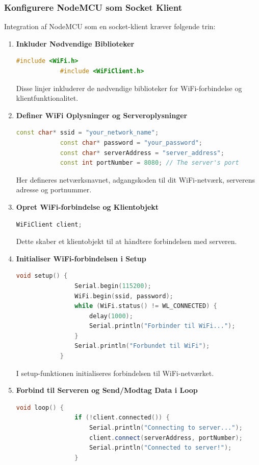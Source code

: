 \documentclass[12pt,a4paper]{book}
\begin{document}
	\subsubsection*{Konfigurere NodeMCU som Socket Klient}
	Integration af NodeMCU som en socket-klient kræver følgende trin:
	
	\begin{enumerate}
		\item \textbf{Inkluder Nødvendige Biblioteker}
		\begin{lstlisting}[language=C++, caption=Syntaks]
			#include <WiFi.h>
			#include <WiFiClient.h>
		\end{lstlisting}
		Disse linjer inkluderer de nødvendige biblioteker for WiFi-forbindelse og klientfunktionalitet.
		
		\item \textbf{Definer WiFi Oplysninger og Serveroplysninger}
		\begin{lstlisting}[language=C++, caption=Syntaks]
			const char* ssid = "your_network_name";
			const char* password = "your_password";
			const char* serverAddress = "server_address";
			const int portNumber = 8080; // The server's port
		\end{lstlisting}
		Her defineres netværksnavnet, adgangskoden til dit WiFi-netværk, serverens adresse og portnummer.
		
		\item \textbf{Opret WiFi-forbindelse og Klientobjekt}
		\begin{lstlisting}[language=C++, caption=Syntaks]
			WiFiClient client;
		\end{lstlisting}
		Dette skaber et klientobjekt til at håndtere forbindelsen med serveren.
		
		\item \textbf{Initialiser WiFi-forbindelsen i Setup}
		\begin{lstlisting}[language=C++, caption=Syntaks]
			void setup() {
				Serial.begin(115200);
				WiFi.begin(ssid, password);
				while (WiFi.status() != WL_CONNECTED) {
					delay(1000);
					Serial.println("Forbinder til WiFi...");
				}
				Serial.println("Forbundet til WiFi");
			}
		\end{lstlisting}
		I setup-funktionen initialiseres forbindelsen til WiFi-netværket.
		
		\item \textbf{Forbind til Serveren og Send/Modtag Data i Loop}
		\begin{lstlisting}[language=C++, caption=Syntaks]
			void loop() {
				if (!client.connected()) {
					Serial.println("Connecting to server...");
					client.connect(serverAddress, portNumber);
					Serial.println("Connected to server!");
				}
				

\end{lstlisting}
\end{enumerate}
\end{document}
